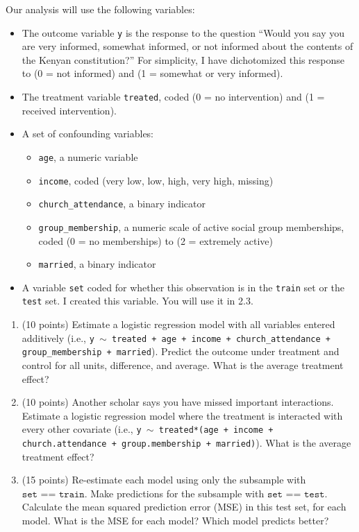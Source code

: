 \documentclass[10pt]{article}
\begin{document}
Our analysis will use the following variables:
\begin{itemize}
    \item The outcome variable \texttt{y} is the response to the question ``Would you say you are very informed, somewhat informed, or not informed about the contents of the Kenyan constitution?'' For simplicity, I have dichotomized this response to (0 = not informed) and (1 = somewhat or very informed).
    \item The treatment variable \texttt{treated}, coded (0 = no intervention) and (1 = received intervention).
    \item A set of confounding variables:
    \begin{itemize}
        \item \texttt{age}, a numeric variable
        \item \texttt{income}, coded (very low, low, high, very high, missing)
        \item \texttt{church\_attendance}, a binary indicator
        \item \texttt{group\_membership}, a numeric scale of active social group memberships, coded (0 = no memberships) to (2 = extremely active)
        \item \texttt{married}, a binary indicator
    \end{itemize}
    \item A variable \texttt{set} coded for whether this observation is in the \texttt{train} set or the \texttt{test} set. I created this variable. You will use it in 2.3.
\end{itemize}

\begin{enumerate}
    \item (10 points) Estimate a logistic regression model with all variables entered additively (i.e., \texttt{y $\sim$ treated + age + income + church\_attendance + group\_membership + married}). Predict the outcome under treatment and control for all units, difference, and average. What is the average treatment effect?
    \item (10 points) Another scholar says you have missed important interactions. Estimate a logistic regression model where the treatment is interacted with every other covariate (i.e., \texttt{y $\sim$ treated*(age + income + church.attendance + group.membership + married)}). What is the average treatment effect?
    \item (15 points) Re-estimate each model using only the subsample with $\texttt{set == train}$. Make predictions for the subsample with $\texttt{set == test}$. Calculate the mean squared prediction error (MSE) in this test set, for each model. What is the MSE for each model? Which model predicts better?
\end{enumerate}
\end{document}
